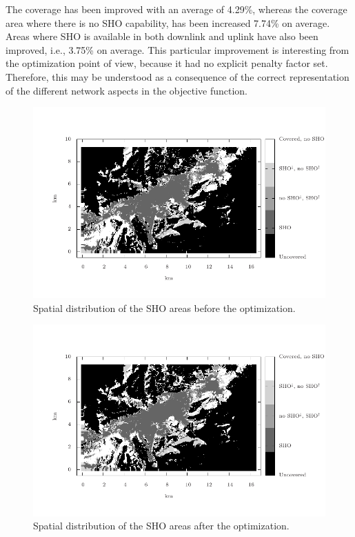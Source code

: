 The coverage has been improved with an average of 4.29\%, whereas
the coverage area where there is no SHO capability, has been increased
7.74\% on average. Areas where SHO is available in both downlink and
uplink have also been improved, i.e., 3.75\% on average. This particular
improvement is interesting from the optimization point of view, because
it had no explicit penalty factor set. Therefore, this may be understood
as a consequence of the correct representation of the different network
aspects in the objective function.

\begin{figure}
\centering

\includegraphics[width=1\textwidth]{07-experimental_evaluation-sho_balancing/img/sho_areas_initial}

\caption{Spatial distribution of the SHO areas before the optimization.\label{fig:07-SHO_areas_initial}}
\end{figure}


\begin{figure}
\centering

\includegraphics[width=1\textwidth]{07-experimental_evaluation-sho_balancing/img/sho_areas_final}

\caption{Spatial distribution of the SHO areas after the optimization.\label{fig:07-SHO_areas_final}}
\end{figure}



